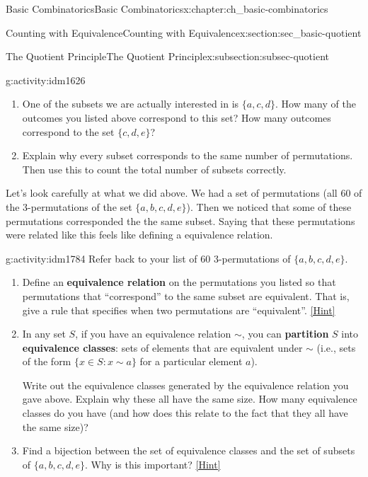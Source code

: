 \documentclass[oneside,10pt,]{book}
\newcommand{\terminology}[1]{\textbf{#1}}
\numberwithin{equation}{chapter}
\def\st{:}
\begin{document}
\begin{chapterptx}{Basic Combinatorics}{}{Basic Combinatorics}{}{}{x:chapter:ch_basic-combinatorics}
\begin{sectionptx}{Counting with Equivalence}{}{Counting with Equivalence}{}{}{x:section:sec_basic-quotient}
\begin{subsectionptx}{The Quotient Principle}{}{The Quotient Principle}{}{}{x:subsection:subsec-quotient}
\begin{activity}{}{g:activity:idm1626}
\begin{enumerate}[font=\bfseries,label=(\alph*),ref=\alph*]
\item{}One of the subsets we are actually interested in is \(\{a,c,d\}\).  How many of the outcomes you listed above correspond to this set?  How many outcomes correspond to the set \(\{c,d,e\}\)?%
\item{}Explain why every subset corresponds to the same number of permutations.  Then use this to count the total number of subsets correctly.%
\end{enumerate}
\end{activity}
%
Let's look carefully at what we did above.  We had a set of permutations (all 60 of the 3-permutations of the set \(\{a,b,c,d,e\}\)).  Then we noticed that some of these permutations corresponded the the same subset.  Saying that these permutations were related like this feels like defining a equivalence relation.%
\begin{activity}{}{g:activity:idm1784}%
Refer back to your list of 60 3-permutations of \(\{a,b,c,d,e\}\).%
\begin{enumerate}[font=\bfseries,label=(\alph*),ref=\alph*]
\item{}Define an \terminology{equivalence relation} on the permutations you listed so that permutations that ``correspond'' to the same subset are equivalent.  That is, give a rule that specifies when two permutations are ``equivalent''.%
\space\hspace*{0pt}\hfill{\tiny\hyperlink{g:hint:idm1794-back}{[Hint]}}\item{}In any set \(S\), if you have an equivalence relation \(\sim\), you can \terminology{partition} \(S\) into \terminology{equivalence classes}: sets of elements that are equivalent under \(\sim\) (i.e., sets of the form \(\{x \in S \st x \sim a\} \) for a particular element \(a\)).%
\par
Write out the equivalence classes generated by the equivalence relation you gave above.  Explain why these all have the same size.  How many equivalence classes do you have (and how does this relate to the fact that they all have the same size)?%
\item{}Find a bijection between the set of equivalence classes and the set of subsets of \(\{a,b,c,d,e\}\).  Why is this important?%
\space\hspace*{0pt}\hfill{\tiny\hyperlink{g:hint:idm1812-back}{[Hint]}}\end{enumerate}
\end{activity}

\end{subsectionptx}
\end{sectionptx}
\end{chapterptx}
\end{document}
